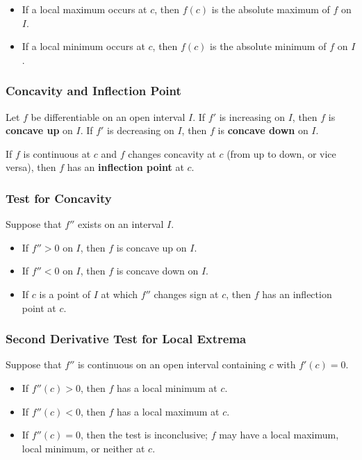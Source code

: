 \begin{itemize}
    \item If a local maximum occurs at $c$, then $f(c)$ is the absolute maximum of $f$ on $I$.
    \item If a local minimum occurs at $c$, then $f(c)$ is the absolute minimum of $f$ on $I$.
\end{itemize}

\subsubsection{Concavity and Inflection Point}
Let $f$ be differentiable on an open interval $I$. If $f'$ is increasing on $I$, then $f$ is \textbf{concave up} on $I$. If $f'$ is decreasing on $I$, then $f$ is \textbf{concave down} on $I$.

If $f$ is continuous at $c$ and $f$ changes concavity at $c$ (from up to down, or vice versa), then $f$ has an \textbf{inflection point} at $c$.

\subsubsection{Test for Concavity}
Suppose that $f''$ exists on an interval $I$.

\begin{itemize}
    \item If $f'' > 0$ on $I$, then $f$ is concave up on $I$.
    \item If $f'' < 0$ on $I$, then $f$ is concave down on $I$.
    \item If $c$ is a point of $I$ at which $f''$ changes sign at $c$, then $f$ has an inflection point at $c$.
\end{itemize}

\subsubsection{Second Derivative Test for Local Extrema}
Suppose that $f''$ is continuous on an open interval containing $c$ with $f'(c) = 0$.

\begin{itemize}
    \item If $f''(c) > 0$, then $f$ has a local minimum at $c$.
    \item If $f''(c) < 0$, then $f$ has a local maximum at $c$.
    \item If $f''(c) = 0$, then the test is inconclusive; $f$ may have a local maximum, local minimum, or neither at $c$.
\end{itemize}
